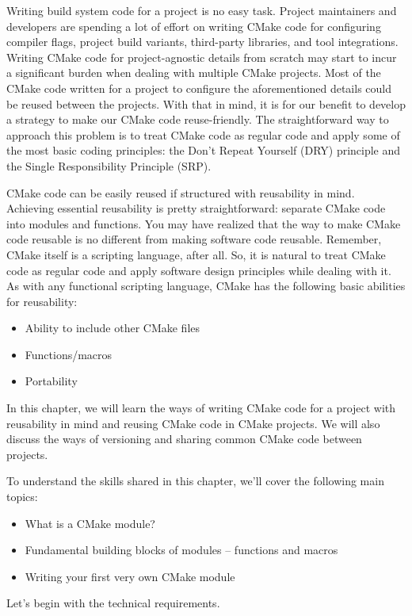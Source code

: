 Writing build system code for a project is no easy task. Project maintainers and developers are spending a lot of effort on writing CMake code for configuring compiler flags, project build variants, third-party libraries, and tool integrations. Writing CMake code for project-agnostic details from scratch may start to incur a significant burden when dealing with multiple CMake projects. Most of the CMake code written for a project to configure the aforementioned details could be reused between the projects. With that in mind, it is for our benefit to develop a strategy to make our CMake code reuse-friendly. The straightforward way to approach this problem is to treat CMake code as regular code and apply some of the most basic coding principles: the Don't Repeat Yourself (DRY) principle and the Single Responsibility Principle (SRP).

CMake code can be easily reused if structured with reusability in mind. Achieving essential reusability is pretty straightforward: separate CMake code into modules and functions. You may have realized that the way to make CMake code reusable is no different from making software code reusable. Remember, CMake itself is a scripting language, after all. So, it is natural to treat CMake code as regular code and apply software design principles while dealing with it. As with any functional scripting language, CMake has the following basic abilities for reusability:

\begin{itemize}
\item 
Ability to include other CMake files

\item 
Functions/macros

\item 
Portability
\end{itemize}

In this chapter, we will learn the ways of writing CMake code for a project with reusability in mind and reusing CMake code in CMake projects. We will also discuss the ways of versioning and sharing common CMake code between projects.

To understand the skills shared in this chapter, we'll cover the following main topics:

\begin{itemize}
\item 
What is a CMake module?

\item 
Fundamental building blocks of modules – functions and macros

\item 
Writing your first very own CMake module
\end{itemize}

Let's begin with the technical requirements.
